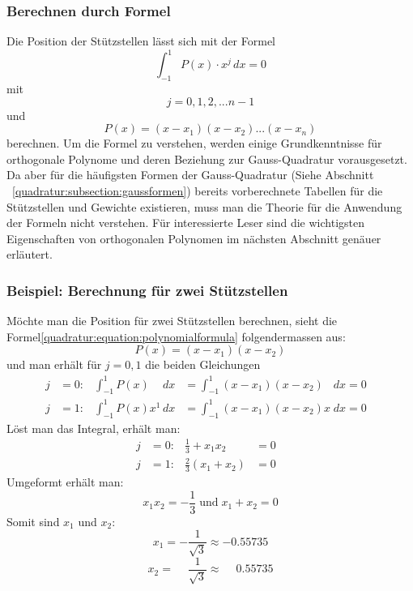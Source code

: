 \subsubsection{Berechnen durch Formel}
Die Position der Stützstellen lässt sich mit der Formel
\begin{equation*}
    \int_{-1}^{1} P(x) \cdot x^{j} \, dx = 0
\end{equation*}
mit
\begin{equation*}
    j = 0, 1, 2, ... n - 1
\end{equation*}
und 
\begin{equation} \label{quadratur:equation:polynomialformula}
    P(x) = (x - x_{1})(x - x_{2}) ... (x - x_{n})
\end{equation}
berechnen. Um die Formel zu verstehen, werden einige Grundkenntnisse für 
orthogonale Polynome und deren Beziehung zur Gauss-Quadratur vorausgesetzt.
Da aber für die häufigsten Formen der Gauss-Quadratur 
(Siehe Abschnitt ~\ref{quadratur:subsection:gaussformen}) bereits vorberechnete
Tabellen für die Stützstellen und Gewichte existieren, muss man die Theorie
für die Anwendung der Formeln nicht verstehen. Für interessierte Leser sind 
die wichtigsten Eigenschaften von orthogonalen Polynomen im nächsten 
Abschnitt genäuer erläutert.

\subsubsection{Beispiel: Berechnung für zwei Stützstellen}
Möchte man die Position für zwei Stützstellen berechnen, 
sieht die Formel\ref{quadratur:equation:polynomialformula} folgendermassen aus:
\begin{equation}
    P(x) = (x - x_{1})(x - x_{2})
\end{equation}
und man erhält für $j = 0,1$ die beiden Gleichungen
\begin{align}
    j &= 0: & \int_{-1}^{1}P(x)\phantom{x^{1}}\,dx  &= \int_{-1}^{1}(x - x_{1})(x - x_{2})\phantom{x} \; dx = 0 & \\
    j &= 1: & \int_{-1}^{1}P(x)x^{1}\,dx            &= \int_{-1}^{1}(x - x_{1})(x - x_{2})x \; dx = 0 &
\end{align}
Löst man das Integral, erhält man:
\begin{align}
    j  &= 0: & \frac{1}{3} + x_{1}x_{2} &= 0 & \\
    j  &= 1: & \frac{2}{3}(x_{1}+x_{2}) &= 0 &
\end{align}
Umgeformt erhält man:
\begin{equation}
    x_{1}x_{2} = -\frac{1}{3}
    \;
    \text{und}
    \;
    x_{1}+x_{2} = 0
\end{equation}
Somit sind $ x_{1} $ und $ x_{2} $:
\begin{equation*}
    x_{1} = -\frac{1}{\sqrt{3}} \approx -0.55735
\end{equation*}
\begin{equation}
    x_{2} = \phantom{-} \frac{1}{\sqrt{3}} \approx \phantom{-}0.55735
\end{equation}

